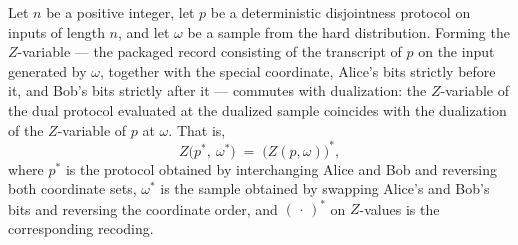 \begin{theorem}
\label{CommunicationComplexity.Functions.Disjointness.RandomizedLowerBound.zVariable_dualProtocol_dualHardSample}
\leanok
{}
Let $n$ be a positive integer, let $p$ be a deterministic disjointness protocol on
inputs of length $n$, and let $\omega$ be a sample from the hard distribution. Forming
the $Z$-variable — the packaged record consisting of the transcript of $p$ on the input
generated by $\omega$, together with the special coordinate, Alice's bits strictly
before it, and Bob's bits strictly after it — commutes with dualization: the
$Z$-variable of the dual protocol evaluated at the dualized sample coincides with the
dualization of the $Z$-variable of $p$ at $\omega$. That is,
\[
Z\bigl(p^\ast,\ \omega^\ast\bigr) \;=\; \bigl(Z(p,\omega)\bigr)^\ast,
\]
where $p^\ast$ is the protocol obtained by interchanging Alice and Bob and reversing
both coordinate sets, $\omega^\ast$ is the sample obtained by swapping Alice's and Bob's
bits and reversing the coordinate order, and $(\,\cdot\,)^\ast$ on $Z$-values is the
corresponding recoding.
\end{theorem}

